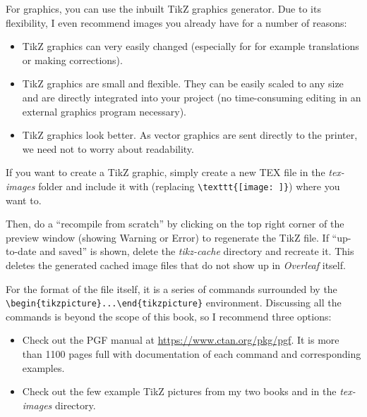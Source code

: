 For graphics, you can use the inbuilt TikZ graphics generator. Due to its flexibility, I even recommend images you already have for a number of reasons:

\begin{itemize}
    \item TikZ graphics can very easily changed (especially for for example translations or making corrections).
    \item TikZ graphics are small and flexible. They can be easily scaled to any size and are directly integrated into your project (no time-consuming editing in an external graphics program necessary).
    \item TikZ graphics look better. As vector graphics are sent directly to the printer, we need not to worry about readability.
\end{itemize}

If you want to create a TikZ graphic, simply create a new TEX file in the \textit{tex-images} folder and include it with \lstinline[language=Tex]!! (replacing \lstinline[language=Tex]!\texttt{[image: ]}!) where you want to. 

Then, do a ``recompile from scratch'' by clicking on the top right corner of the preview window (showing Warning or Error) to regenerate the TikZ file. If ``up-to-date and saved'' is shown, delete the \textit{tikz-cache} directory and recreate it. This deletes the generated cached image files that do not show up in \textit{Overleaf} itself.

For the format of the file itself, it is a series of commands surrounded by the \lstinline[language=Tex]!\begin{tikzpicture}...\end{tikzpicture}! environment. Discussing all the commands is beyond the scope of this book, so I recommend three options:

\begin{itemize}
    \item Check out the PGF manual at \url{https://www.ctan.org/pkg/pgf}. It is more than 1100 pages full with documentation of each command and corresponding examples.
    \item Check out the few example TikZ pictures from my two books \cite{PFH1E} and \cite{PFH2E} in the \textit{tex-images} directory.
\end{itemize}